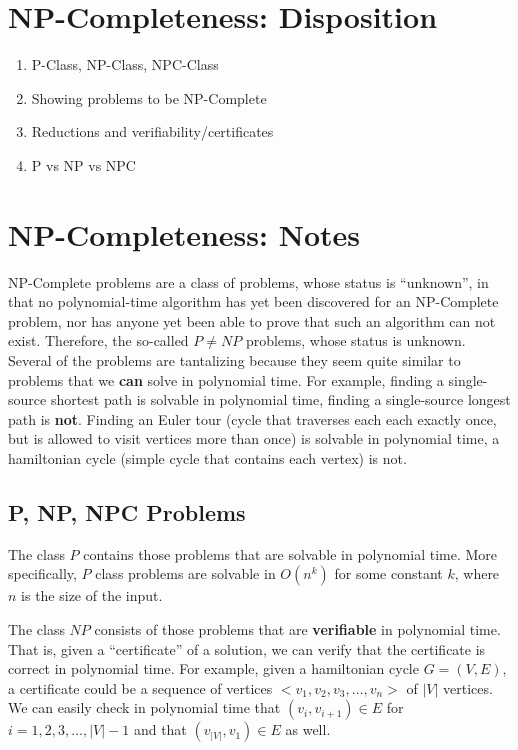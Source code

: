 \section{NP-Completeness: Disposition}
\begin{enumerate}
  \item P-Class, NP-Class, NPC-Class
  \item Showing problems to be NP-Complete
  \item Reductions and verifiability/certificates
  \item P vs NP vs NPC
\end{enumerate}

\section{NP-Completeness: Notes}
NP-Complete problems are a class of problems, whose status is ``unknown'', in that
no polynomial-time algorithm has yet been discovered for an NP-Complete problem, nor
has anyone yet been able to prove that such an algorithm can not exist. Therefore, the
so-called $P \neq NP$ problems, whose status is unknown. Several of the problems are tantalizing
because they seem quite similar to problems that we \textbf{can} solve in polynomial time. For example,
finding a single-source shortest path is solvable in polynomial time, finding a single-source longest
path is \textbf{not}. Finding an Euler tour (cycle that traverses each each exactly once, but is allowed
to visit vertices more than once) is solvable in polynomial time, a hamiltonian cycle (simple cycle that
contains each vertex) is not.

\subsection{P, NP, NPC Problems}
The class $P$ contains those problems that are solvable in polynomial time. More specifically, $P$ class
problems are solvable in $O(n^k)$ for some constant $k$, where $n$ is the size of the input.

The class $NP$ consists of those problems that are \textbf{verifiable} in polynomial time. That is, given
a ``certificate'' of a solution, we can verify that the certificate is correct in polynomial time. For example,
given a hamiltonian cycle $G = (V,E)$, a certificate could be a sequence of vertices $<v_1, v_2, v_3, \hdots, v_n>$
of $|V|$ vertices. We can easily check in polynomial time that $(v_i, v_{i+1}) \in E$ for $i = 1,2,3,\hdots,|V|-1$
and that $(v_{|V|},v_1) \in E$ as well.

